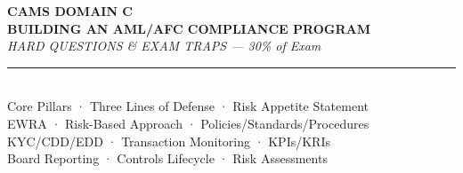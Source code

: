 \documentclass[12pt,aspectratio=169]{beamer}
\begin{document}
	
	\begin{frame}
		\centering
		\vspace{0.5cm}
		{\fontsize{18}{22}\selectfont \textbf{CAMS DOMAIN C}}\\[0.15cm]
		{\fontsize{14}{17}\selectfont \textbf{BUILDING AN AML/AFC COMPLIANCE PROGRAM}}\\[0.2cm]
		{\fontsize{9}{11}\selectfont \textit{HARD QUESTIONS \& EXAM TRAPS — 30\% of Exam}}\\[0.1cm]
		\rule{4cm}{0.5pt}\\[0.1cm]
		{\fontsize{7}{9}\selectfont Core Pillars · Three Lines of Defense · Risk Appetite Statement}\\[0.05cm]
		{\fontsize{7}{9}\selectfont EWRA · Risk-Based Approach · Policies/Standards/Procedures}\\[0.05cm]
		{\fontsize{7}{9}\selectfont KYC/CDD/EDD · Transaction Monitoring · KPIs/KRIs}\\[0.05cm]
		{\fontsize{7}{9}\selectfont Board Reporting · Controls Lifecycle · Risk Assessments}
		\vspace{0.3cm}
	\end{frame}
	
\end{document}
